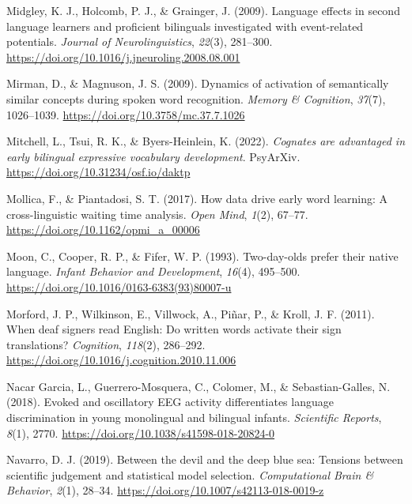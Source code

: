 \documentclass[
  12pt,
  b5paperpaper,
  twoside]{scrreprt}
\newlength{\cslhangindent}
\newlength{\cslentryspacingunit} %
\newenvironment{CSLReferences}[2] %
 {%
  \setlength{\parindent}{0pt}
  \ifodd #1
  \let\oldpar\par
  \def\par{\hangindent=\cslhangindent\oldpar}
  \fi
  \setlength{\parskip}{#2\cslentryspacingunit}
 }%
 {}
\begin{document}
\begin{CSLReferences}{1}{0}
\leavevmode{}%
Midgley, K. J., Holcomb, P. J., \& Grainger, J. (2009). Language effects
in second language learners and proficient bilinguals investigated with
event-related potentials. \emph{Journal of Neurolinguistics},
\emph{22}(3), 281--300.
\url{https://doi.org/10.1016/j.jneuroling.2008.08.001}

\leavevmode{}%
Mirman, D., \& Magnuson, J. S. (2009). Dynamics of activation of
semantically similar concepts during spoken word recognition.
\emph{Memory \& Cognition}, \emph{37}(7), 1026--1039.
\url{https://doi.org/10.3758/mc.37.7.1026}

\leavevmode{}%
Mitchell, L., Tsui, R. K., \& Byers-Heinlein, K. (2022). \emph{Cognates
are advantaged in early bilingual expressive vocabulary development}.
{PsyArXiv}. \url{https://doi.org/10.31234/osf.io/daktp}

\leavevmode{}%
Mollica, F., \& Piantadosi, S. T. (2017). How data drive early word
learning: A cross-linguistic waiting time analysis. \emph{Open Mind},
\emph{1}(2), 67--77. \url{https://doi.org/10.1162/opmi_a_00006}

\leavevmode{}%
Moon, C., Cooper, R. P., \& Fifer, W. P. (1993). Two-day-olds prefer
their native language. \emph{Infant Behavior and Development},
\emph{16}(4), 495--500.
\url{https://doi.org/10.1016/0163-6383(93)80007-u}

\leavevmode{}%
Morford, J. P., Wilkinson, E., Villwock, A., Piñar, P., \& Kroll, J. F.
(2011). When deaf signers read {English}: Do written words activate
their sign translations? \emph{Cognition}, \emph{118}(2), 286--292.
\url{https://doi.org/10.1016/j.cognition.2010.11.006}

\leavevmode{}%
Nacar Garcia, L., Guerrero-Mosquera, C., Colomer, M., \&
Sebastian-Galles, N. (2018). Evoked and oscillatory {EEG} activity
differentiates language discrimination in young monolingual and
bilingual infants. \emph{Scientific Reports}, \emph{8}(1), 2770.
\url{https://doi.org/10.1038/s41598-018-20824-0}

\leavevmode{}%
Navarro, D. J. (2019). Between the devil and the deep blue sea: Tensions
between scientific judgement and statistical model selection.
\emph{Computational Brain \& Behavior}, \emph{2}(1), 28--34.
\url{https://doi.org/10.1007/s42113-018-0019-z}


\end{CSLReferences}
\end{document}
